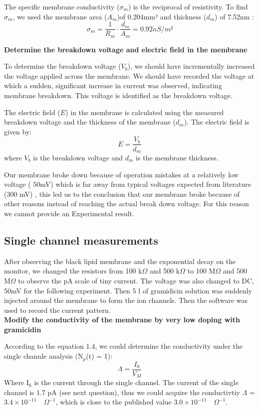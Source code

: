\documentclass[a4paper,english,12pt,bibliography=totoc]{scrreprt}
\begin{document}
The specific membrane conductivity ($\sigma_m$) is the reciprocal of resistivity. To find $\sigma_m$, we used the membrane area ($A_m$)of 0.204mm² and thickness ($d_m$) of 7.52nm  :
\begin{equation}
\sigma_m = \frac{1}{R_m} \cdot \frac{d_m}{A_m} = 0.92 nS/m²
\end{equation}

\textbf{Determine the breakdown voltage and electric field in the membrane}

To determine the breakdown voltage (\(V_b\)), we should have incrementally increased the voltage applied across the membrane. We should have recorded the voltage at which a sudden, significant increase in current was observed, indicating membrane breakdown. This voltage is identified as the breakdown voltage.


The electric field (\(E\)) in the membrane is calculated using the measured breakdown voltage and the thickness of the membrane (\(d_m\)). The electric field is given by:
\begin{equation}
E = \frac{V_b}{d_m}
\end{equation}
where \(V_b\) is the breakdown voltage and \(d_m\) is the membrane thickness.

Our membrane broke down because of operation mistakes at a relatively low voltage ( 50mV)  which is far away from typical voltages expected from literature (300 mV) \cite{Benz1979}, this led us to the conclusion that our membrane broke because of other reasons instead of reaching the actual break down voltage. For this reason we cannot provide an Experimental result.

\subsection{Single channel measurements}
After observing the black lipid membrane and the exponential decay on the monitor, we changed the resistors from 100 k$\Omega$ and 500 k$\Omega$ to 100 M$\Omega$ and 500 M$\Omega$ to observe the pA scale of tiny current. The voltage was also changed to DC, 50mV for the following experiment. Then 5 \textmu l of gramidicin solution was suddenly injected around the membrane to form the ion channels. Then the software was used to record the current pattern. \\

\textbf{Modify the conductivity of the membrane by very low doping with gramicidin}

According to the equation 1.4, we could determine the conductivity under the single channle analysis (N$_p$(t) = 1):
\begin{equation}
    \Lambda = \frac{I_0}{V_M}
\end{equation}
Where I$_0$ is the current through the single channel. The current of the single channel is  1.7 pA (see next question), thus we could acquire the conductivtiy $\Lambda$ = $3.4 \times 10^{-11} \quad \Omega^{-1}$, which is close to the published value $3.0 \times 10^{-11} \quad \Omega^{-1}$. \cite{conductivity} \\
\end{document}
